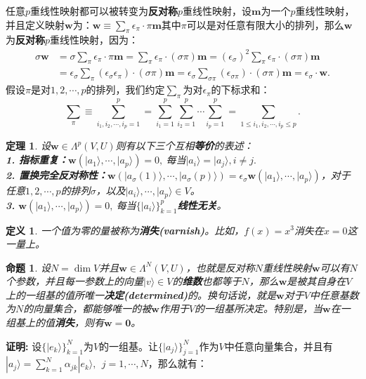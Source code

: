 \documentclass[mathserif,hyperref,UTF8,openany,b5paper]{ctexbook}
\newtheorem{defn}{定义}[section]
\newtheorem{thm}{定理}[section]
\newtheorem{pro}{命题}[section]
\begin{document}
任意$p$重线性映射都可以被转变为\textbf{反对称}$p$重线性映射，设$\mathbf{m}$为一个$p$重线性映射，并且定义映射$\mathbf{w}$为：$\mathbf{w}\equiv\sum_\pi\epsilon_\pi\cdot\pi\mathbf{m}$其中$\pi$可以是对任意有限大小的排列，那么$\mathbf{w}$为\textbf{反对称}$p$重线性映射，因为：
\begin{align}
\sigma\mathbf{w}&=\sigma\sum_\pi\epsilon_\pi\cdot\pi\mathbf{m}=\sum_\pi\epsilon_\pi\cdot(\sigma\pi)\mathbf{m}=(\epsilon_\sigma)^2\sum_\pi\epsilon_\pi\cdot(\sigma\pi)\mathbf{m}\\
&=\epsilon_\sigma\sum_\pi(\epsilon_\sigma\epsilon_\pi)\cdot(\sigma\pi)\mathbf{m}=\epsilon_\sigma\sum_{\sigma\pi}(\epsilon_{\sigma\pi})\cdot(\sigma\pi)\mathbf{m}=\epsilon_{\sigma}\cdot\mathbf{w}.
\end{align}
假设$\pi$是对$1,2,\cdots,p$的排列，我们约定$\sum_\pi$为对$\epsilon_\pi$的下标求和：\begin{equation}
\sum_\pi\equiv\sum^p_{i_1,i_2,\cdots,i_p=1}=\sum^p_{i_1=1}\sum^p_{i_2=1}\cdots\sum^p_{i_p=1}=\sum_{1\leq i_1,i_2,\cdots,i_p\leq p}.
\end{equation}
\begin{thm}设$\mathbf{w}\in\Lambda^p(V,U)$则有以下三个互相\textbf{等价}的表述：\\
\textbf{1. 指标重复：}$\mathbf{w}(|a_1\rangle,\cdots,|a_p\rangle)=0,\ $每当$|a_i\rangle=|a_j\rangle,i\neq j.$\\
\textbf{2. 置换完全反对称性：}$\mathbf{w}(|a_\sigma(1)\rangle,\cdots,|a_\sigma(p)\rangle)=\epsilon_{\sigma}\mathbf{w}(|a_1\rangle,\cdots,|a_p\rangle)$，对于任意$1,2,\cdots,p$的排列$\sigma$，以及$|a_i\rangle,\cdots,|a_p\rangle\in V$。\\
\textbf{3.} $\mathbf{w}(|a_1\rangle,\cdots,|a_p\rangle)=0,\ $每当$\{|a_i\rangle\}^p_{k=1}$\textbf{线性无关}。
\end{thm}
\begin{defn}
一个值为零的量被称为\textbf{消失(varnish)}。比如，$f(x)=x^3$消失在$x=0$这一量上。
\end{defn}
\begin{pro}
设$N=\dim V$并且$\mathbf{w}\in\Lambda^N(V,U)$，也就是反对称$N$重线性映射$\mathbf{w}$可以有$N$个参数，并且每一参数上的向量$|v\rangle\in V$的\textbf{维数}也都等于$N$，那么$\mathbf{w}$是被其自身在$V$上的一组基的值所唯一\textbf{决定(determined)}的。换句话说，就是$\mathbf{w}$对于$V$中任意基数为$N$的向量集合，都能够唯一的被$\mathbf{w}$作用于$V$的一组基所决定。特别是，当$\mathbf{w}$在一组基上的值\textbf{消失}，则有$\mathbf{w=0}$。
\end{pro}
\textbf{证明:} 设$\{|e_k\rangle\}^N_{k=1}$为$V$的一组基。让$\{|a_j\rangle\}^N_{j=1}$作为$V$中任意向量集合，并且有$|a_j\rangle = \sum^N_{k=1}\alpha_{jk}|e_k\rangle,\ \ j=1,\cdots,N$，那么就有：
\end{document}
